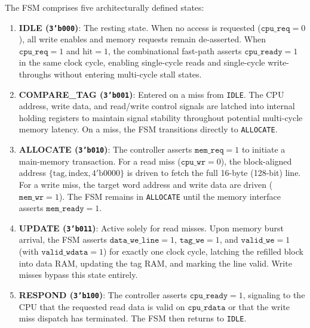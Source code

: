 The FSM comprises five architecturally defined states:
\begin{enumerate}
    \item \textbf{IDLE (\texttt{3'b000})}: The resting state. When no access
          is requested ($\texttt{cpu\_req} = 0$), all write enables and
          memory requests remain de-asserted. When $\texttt{cpu\_req} = 1$
          and $\mathrm{hit} = 1$, the combinational fast-path asserts
          $\texttt{cpu\_ready} = 1$ in the same clock cycle, enabling
          single-cycle reads and single-cycle write-throughs without entering
          multi-cycle stall states.
    \item \textbf{COMPARE\_TAG (\texttt{3'b001})}: Entered on a miss from
          \texttt{IDLE}. The CPU address, write data, and read/write control
          signals are latched into internal holding registers to maintain
          signal stability throughout potential multi-cycle memory latency.
          On a miss, the FSM transitions directly to \texttt{ALLOCATE}.
    \item \textbf{ALLOCATE (\texttt{3'b010})}: The controller asserts
          $\texttt{mem\_req} = 1$ to initiate a main-memory transaction.
          For a read miss ($\texttt{cpu\_wr} = 0$), the block-aligned address
          $\{\mathrm{tag}, \mathrm{index}, 4'\mathrm{b}0000\}$ is driven to
          fetch the full 16-byte (128-bit) line. For a write miss, the target
          word address and write data are driven ($\texttt{mem\_wr} = 1$).
          The FSM remains in \texttt{ALLOCATE} until the memory interface
          asserts $\texttt{mem\_ready} = 1$.
    \item \textbf{UPDATE (\texttt{3'b011})}: Active solely for read misses.
          Upon memory burst arrival, the FSM asserts $\texttt{data\_we\_line} = 1$,
          $\texttt{tag\_we} = 1$, and $\texttt{valid\_we} = 1$ (with
          $\texttt{valid\_wdata} = 1$) for exactly one clock cycle, latching
          the refilled block into data RAM, updating the tag RAM, and marking
          the line valid. Write misses bypass this state entirely.
    \item \textbf{RESPOND (\texttt{3'b100})}: The controller asserts
          $\texttt{cpu\_ready} = 1$, signaling to the CPU that the requested
          read data is valid on $\texttt{cpu\_rdata}$ or that the write miss
          dispatch has terminated. The FSM then returns to \texttt{IDLE}.
\end{enumerate}

